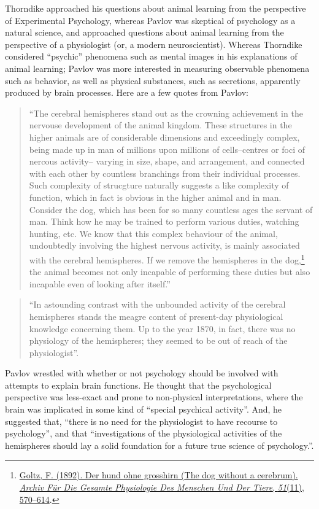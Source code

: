 \documentclass[
  oneside,
  12pt]{crumpbook}
\begin{document}
Thorndike approached his questions about animal learning from the perspective of Experimental Psychology, whereas Pavlov was skeptical of psychology as a natural science, and approached questions about animal learning from the perspective of a physiologist (or, a modern neuroscientist). Whereas Thorndike considered ``psychic'' phenomena such as mental images in his explanations of animal learning; Pavlov was more interested in measuring observable phenomena such as behavior, as well as physical substances, such as secretions, apparently produced by brain processes. Here are a few quotes from Pavlov:

\begin{quote}
``The cerebral hemispheres stand out as the crowning achievement in the nervouse development of the animal kingdom. These structures in the higher animals are of considerable dimensions and exceedingly complex, being made up in man of millions upon millions of cells--centres or foci of nercous activity-- varying in size, shape, and arrangement, and connected with each other by countless branchings from their individual processes. Such complexity of strucgture naturally suggests a like complexity of function, which in fact is obvious in the higher animal and in man. Consider the dog, which has been for so many countless ages the servant of man. Think how he may be trained to perform various duties, watching hunting, etc. We know that this complex behaviour of the animal, undoubtedly involving the highest nervous activity, is mainly associated with the cerebral hemispheres. If we remove the hemispheres in the dog,\footnote{\protect\hyperlink{ref-goltzHundOhneGrosshirn1892}{Goltz, F. (1892). Der hund ohne grosshirn ({The} dog without a cerebrum). \emph{Archiv Für Die Gesamte Physiologie Des Menschen Und Der Tiere}, \emph{51}(11), 570--614}.} the animal becomes not only incapable of performing these duties but also incapable even of looking after itself.''
\end{quote}

\begin{quote}
``In astounding contrast with the unbounded activity of the cerebral hemispheres stands the meagre content of present-day physiological knowledge concerning them. Up to the year 1870, in fact, there was no physiology of the hemispheres; they seemed to be out of reach of the physiologist''.
\end{quote}

Pavlov wrestled with whether or not psychology should be involved with attempts to explain brain functions. He thought that the psychological perspective was less-exact and prone to non-physical interpretations, where the brain was implicated in some kind of ``special psychical activity''. And, he suggested that, ``there is no need for the physiologist to have recourse to psychology'', and that ``investigations of the physiological activities of the hemispheres should lay a solid foundation for a future true science of psychology.''.
\end{document}
